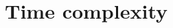 \documentclass[]{beamer}
\begin{document}



         
        
\section{Time complexity}
\end{document}
